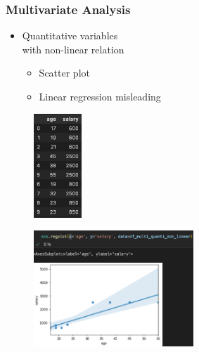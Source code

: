 \begin{frame}\frametitle{Multivariate Analysis}
   \begin{minipage}{0.48\linewidth}
      \begin{itemize}
         \item Quantitative variables\\
               with non-linear relation
         \begin{itemize}
            \item Scatter plot
            \item Linear regression misleading
         \end{itemize}
      \end{itemize}
      \vspace{.5cm}
      \begin{figure}[H]
         \includegraphics[width=1.8cm]{../images/illustrations/pattern_multivariate_quantitative_non_linear_df.png}
      \end{figure}
   \end{minipage}
   \begin{minipage}{0.48\linewidth}
      \begin{figure}[H]
         \includegraphics[width=6cm]{../images/illustrations/pattern_multivariate_quantitative_non_linear_scatter.png}
      \end{figure}
   \end{minipage}
\end{frame}


